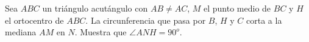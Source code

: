 Sea $ABC$ un triángulo acutángulo con $AB \neq AC$, $M$ el punto medio de $BC$ y $H$ el
ortocentro de $ABC$. La circunferencia que pasa por $B$, $H$ y $C$ corta a la mediana $AM$ en
$N$. Muestra que $\angle ANH = 90^o$.